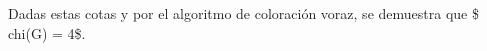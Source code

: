\documentclass[preview]{standalone}
\begin{document}
\begin{center}
Dadas estas cotas y por el algoritmo de coloración voraz, se demuestra que \$\\chi(G) = 4\$.
\end{center}
\end{document}
